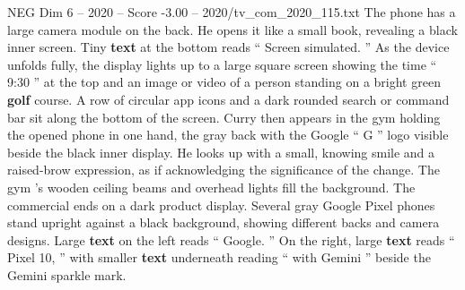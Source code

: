 \begin{textsample}{NEG Dim 6 – 2020 – Score -3.00 – 2020/tv\_com\_2020\_115.txt}
The phone has a large camera module on the back.
He opens it like a small book, revealing a black inner screen.
Tiny \textbf{text} at the bottom reads “ Screen simulated. ” As the device unfolds fully, the display lights up to a large square screen showing the time “ 9:30 ” at the top and an image or video of a person standing on a bright green \textbf{golf} course.
A row of circular app icons and a dark rounded search or command bar sit along the bottom of the screen.
Curry then appears in the gym holding the opened phone in one hand, the gray back with the Google “ G ” logo visible beside the black inner display.
He looks up with a small, knowing smile and a raised-brow expression, as if acknowledging the significance of the change.
The gym ’s wooden ceiling beams and overhead lights fill the background.
The commercial ends on a dark product display.
Several gray Google Pixel phones stand upright against a black background, showing different backs and camera designs.
Large \textbf{text} on the left reads “ Google. ” On the right, large \textbf{text} reads “ Pixel 10, ” with smaller \textbf{text} underneath reading “ with Gemini ” beside the Gemini sparkle mark.

\end{textsample}
